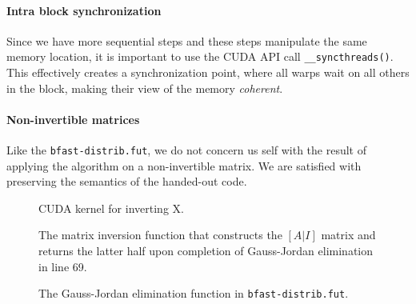 \paragraph{Intra block synchronization}
Since we have more sequential steps and these steps manipulate the same memory
location, it is important to use the CUDA API call \texttt{\_\_syncthreads()}.
This effectively creates a synchronization point, where all warps wait on all
others in the block, making their view of the memory \textit{coherent}.

\paragraph{Non-invertible matrices}
Like the \texttt{bfast-distrib.fut}, we do not concern us self with the result
of applying the algorithm on a non-invertible matrix. We are satisfied with
preserving the semantics of the handed-out code.


\begin{figure}[H]
    \centering
    \caption{CUDA kernel for inverting X.}
    \label{cuda:kernel3}
\end{figure}


\begin{figure}[H]
    \centering
    \caption{The matrix inversion function that constructs the \([A|I]\) matrix
    and returns the latter half upon completion of Gauss-Jordan elimination in
line 69.}
    \label{fut:matinv}
\end{figure}

\begin{figure}[H]
    \centering
    \caption{The Gauss-Jordan elimination function in \texttt{bfast-distrib.fut}.}
    \label{fut:gaussjordan}
\end{figure}





